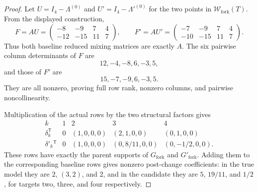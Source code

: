 \documentclass{article}
\begin{document}
\begin{proof}
Let \(U=I_4-\Lambda^{(0)}\) and \(U'=I_4-\Lambda'^{(0)}\) for the two points in \(\mathcal W_{\mathrm{fork}}(T)\).  From the displayed construction,
\[
 F=AU=\begin{pmatrix}-8&-9&7&4\\-12&-15&11&7\end{pmatrix},
 \qquad
 F'=AU'=\begin{pmatrix}-7&-9&7&4\\-10&-15&11&7\end{pmatrix}.
\]
Thus both baseline reduced mixing matrices are exactly \(A\).  The six pairwise column determinants of \(F\) are
\[
 12,-4,-8,6,-3,5,
\]
and those of \(F'\) are
\[
 15,-7,-9,6,-3,5.
\]
They are all nonzero, proving full row rank, nonzero columns, and pairwise noncollinearity.

Multiplication of the actual rows by the two structural factors gives
\[
 \begin{array}{c|cccc}
 k&1&2&3&4\\ \hline
 \delta_k^{\mathsf T}&0&(1,0,0,0)&(2,1,0,0)&(0,1,0,0)\\
 \delta'_k{}^{\mathsf T}&0&(1,0,0,0)&(0,8/11,0,0)&(0,-1/2,0,0).
 \end{array}
\]
These rows have exactly the parent supports of \(G_{\mathrm{fork}}\) and \(G'_{\mathrm{fork}}\).  Adding them to the corresponding baseline rows gives nonzero post-change coefficients: in the true model they are \(2\), \((3,2)\), and \(2\), and in the candidate they are \(5\), \(19/11\), and \(1/2\), for targets two, three, and four respectively.


\end{proof}
\end{document}
